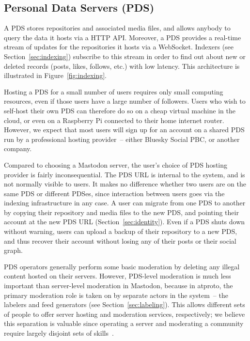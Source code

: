 \documentclass[sigconf]{acmart}
\begin{document}
\subsection{Personal Data Servers (PDS)}\label{sec:pds}

A PDS stores repositories and associated media files, and allows anybody to query the data it hosts via a HTTP API.
Moreover, a PDS provides a real-time stream of updates for the repositories it hosts via a WebSocket.
Indexers (see Section~\ref{sec:indexing}) subscribe to this stream in order to find out about new or deleted records (posts, likes, follows, etc.) with low latency.
This architecture is illustrated in Figure~\ref{fig:indexing}.

Hosting a PDS for a small number of users requires only small computing resources, even if those users have a large number of followers.
Users who wish to self-host their own PDS can therefore do so on a cheap virtual machine in the cloud, or even on a Raspberry Pi connected to their home internet router.
However, we expect that most users will sign up for an account on a shared PDS run by a professional hosting provider~-- either Bluesky Social PBC, or another company.

Compared to choosing a Mastodon server, the user's choice of PDS hosting provider is fairly inconsequential.
The PDS URL is internal to the system, and is not normally visible to users.
It makes no difference whether two users are on the same PDS or different PDSes, since interaction between users goes via the indexing infrastructure in any case.
A user can migrate from one PDS to another by copying their repository and media files to the new PDS, and pointing their account at the new PDS URL (Section~\ref{sec:identity}).
Even if a PDS shuts down without warning, users can upload a backup of their repository to a new PDS, and thus recover their account without losing any of their posts or their social graph.

PDS operators generally perform some basic moderation by deleting any illegal content hosted on their servers.
However, PDS-level moderation is much less important than server-level moderation in Mastodon, because in atproto, the primary moderation role is taken on by separate actors in the system~-- the labelers and feed generators (see Section~\ref{sec:labeling}).
This allows different sets of people to offer server hosting and moderation services, respectively; we believe this separation is valuable since operating a server and moderating a community require largely disjoint sets of skills~\cite{Roth:2023}.
\end{document}
